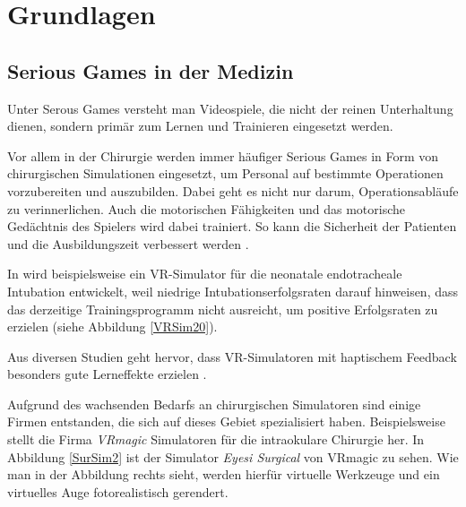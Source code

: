 \chapter{Grundlagen}

\section{Serious Games in der Medizin}
\label{sec_SeriousGames}



Unter Serous Games versteht man Videospiele, die nicht der reinen Unterhaltung dienen, sondern primär zum Lernen und Trainieren eingesetzt werden.

Vor allem in der Chirurgie werden immer häufiger Serious Games in Form von chirurgischen Simulationen eingesetzt, um Personal auf bestimmte Operationen vorzubereiten und auszubilden. Dabei geht es nicht nur darum, Operationsabläufe zu verinnerlichen. Auch die motorischen Fähigkeiten und das motorische Gedächtnis des Spielers wird dabei trainiert. So kann die Sicherheit der Patienten und die Ausbildungszeit verbessert werden \cite{SimRole}.

In \cite{VRSim20} wird beispielsweise ein VR-Simulator für die neonatale endotracheale Intubation entwickelt, weil niedrige Intubationserfolgsraten darauf hinweisen, dass das derzeitige Trainingsprogramm nicht ausreicht, um positive Erfolgsraten zu erzielen (siehe Abbildung \ref{VRSim20}).


Aus diversen Studien geht hervor, dass VR-Simulatoren mit haptischem Feedback besonders gute Lerneffekte erzielen \cite{VRHapticSim}.

Aufgrund des wachsenden Bedarfs an chirurgischen Simulatoren sind einige Firmen entstanden, die sich auf dieses Gebiet spezialisiert haben. Beispielsweise stellt die Firma \textit{VRmagic} \cite{VRmagic} Simulatoren für die intraokulare Chirurgie her. In Abbildung \ref{SurSim2} ist der Simulator \textit{Eyesi Surgical} von VRmagic zu sehen. Wie man in der Abbildung rechts sieht, werden hierfür virtuelle Werkzeuge und ein virtuelles Auge fotorealistisch gerendert.

